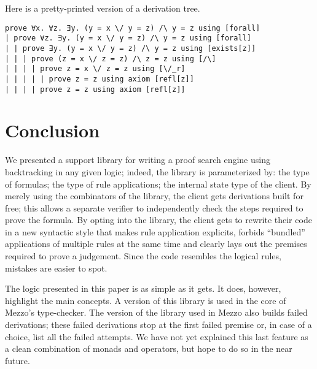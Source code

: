 \documentclass{easychair}
\begin{document}
Here is a pretty-printed version of a derivation tree. 

\begin{verbatim}
prove ∀x. ∀z. ∃y. (y = x \/ y = z) /\ y = z using [forall]
| prove ∀z. ∃y. (y = x \/ y = z) /\ y = z using [forall]
| | prove ∃y. (y = x \/ y = z) /\ y = z using [exists[z]]
| | | prove (z = x \/ z = z) /\ z = z using [/\]
| | | | prove z = x \/ z = z using [\/_r]
| | | | | prove z = z using axiom [refl[z]]
| | | | prove z = z using axiom [refl[z]]
\end{verbatim}

\section{Conclusion}

We presented a support library for writing a proof search engine using backtracking in
any given logic; indeed, the library is parameterized by: the type of formulas; the type of
rule applications; the internal state type of the client. By merely using the
combinators of the library, the client gets derivations built for free; this allows
a separate verifier to independently check the steps required to prove the
formula. By opting into the library, the client gets to rewrite their code in a
new syntactic style that makes rule application explicits, forbids ``bundled''
applications of multiple rules at the same time and clearly lays out the
premises required to prove a judgement. Since the code resembles the logical
rules, mistakes are easier to spot.

The logic presented in this paper is as simple as it gets. It does, however,
highlight the main concepts. A version of this library is used in the core of
Mezzo's type-checker. The version of the library used in Mezzo also builds
failed derivations; these failed derivations stop at the first failed premise
or, in case of a choice, list all the failed attempts. We have not yet explained
this last feature as a clean combination of monads and operators, but hope to do
so in the near future.



\end{document}

